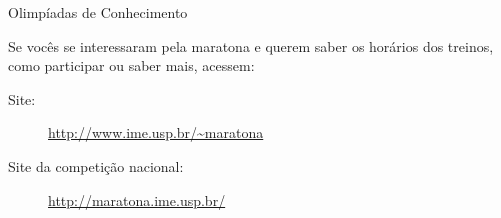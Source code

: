 \begin{subsecao}{Olimpíadas de Conhecimento}
\begin{itemize}
Se vocês se interessaram pela maratona e querem saber os horários dos
treinos, como participar ou saber mais, acessem:

\begin{description}
  \item[Site:] \url{http://www.ime.usp.br/~maratona}
  \item[Site da competição nacional:] \url{http://maratona.ime.usp.br/}
\end{description}

\end{itemize}


\end{subsecao}
